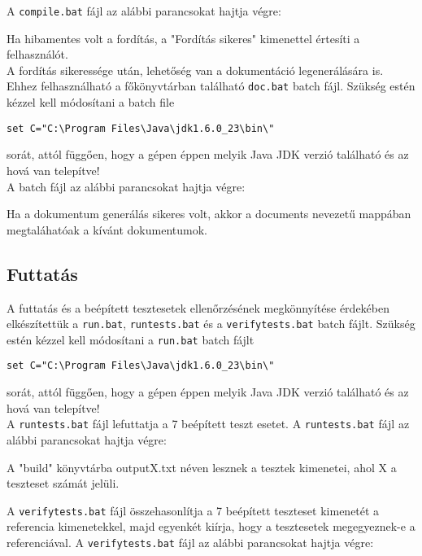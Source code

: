 A \texttt{compile.bat} fájl az alábbi parancsokat hajtja végre:

Ha hibamentes volt a fordítás, a "Fordítás sikeres" kimenettel értesíti a felhasználót.\\

A fordítás sikeressége után, lehetőség van a dokumentáció legenerálására is. Ehhez felhasználható a főkönyvtárban található \texttt{doc.bat} batch fájl.
Szükség estén kézzel kell módosítani a batch file \begin{verbatim}
set C="C:\Program Files\Java\jdk1.6.0_23\bin\" 
\end{verbatim}
sorát, attól függően, hogy a gépen éppen melyik Java JDK verzió található és az hová van telepítve!\\

A batch fájl az alábbi parancsokat hajtja végre:

Ha a dokumentum generálás sikeres volt, akkor a documents nevezetű mappában megtaláhatóak a kívánt dokumentumok.



\subsection{Futtatás}
A futtatás és a beépített tesztesetek ellenőrzésének megkönnyítése érdekében elkészítettük a \texttt{run.bat}, \texttt{runtests.bat} és a \texttt{verifytests.bat} batch fájlt.
Szükség estén kézzel kell módosítani a \texttt{run.bat} batch fájlt 
\begin{verbatim}
set C="C:\Program Files\Java\jdk1.6.0_23\bin\" 
\end{verbatim} sorát, attól függően, hogy a gépen éppen melyik Java JDK verzió található és az hová van telepítve!\\

A \texttt{runtests.bat} fájl lefuttatja a 7 beépített teszt esetet.
A \texttt{runtests.bat} fájl az alábbi parancsokat hajtja végre:

A "build" könyvtárba outputX.txt néven lesznek a tesztek kimenetei, ahol X a teszteset számát jelüli.

A \texttt{verifytests.bat} fájl összehasonlítja a 7 beépített teszteset kimenetét a referencia kimenetekkel, majd egyenkét kiírja, hogy a tesztesetek megegyeznek-e a referenciával.
A \texttt{verifytests.bat} fájl az alábbi parancsokat hajtja végre:



